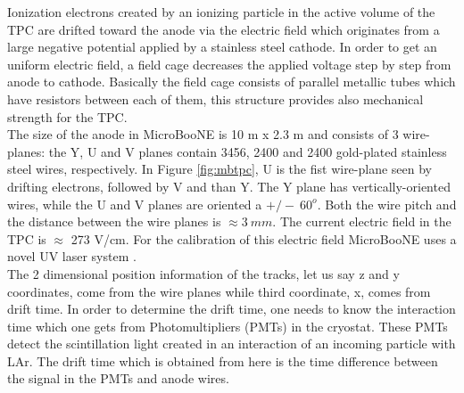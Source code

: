 \documentclass[a4paper]{article}\linespread{1.4}
\begin{document}
Ionization electrons created by an ionizing particle in the active volume of the TPC are drifted toward the anode via the electric field which originates from a large negative potential applied by a stainless steel cathode.
In order to get an uniform electric field, a field cage decreases the applied voltage step by step from anode to cathode. Basically the field cage consists of parallel metallic tubes which have resistors between each of them, this structure provides also mechanical strength for the TPC.
\\The size of the anode in MicroBooNE is 10 m x 2.3 m and consists of 3 wire-planes: the Y, U and V planes contain 3456, 2400 and 2400 gold-plated stainless steel wires, respectively. In Figure \ref{fig:mbtpc}, U is the fist wire-plane seen by drifting electrons, followed by V and than Y. The Y plane has vertically-oriented wires, while the U and V planes are oriented a $+/- \ 60^{o}$.
Both the wire pitch and the distance between the wire planes is $\approx 3~mm$.
The current electric field in the TPC is $\approx$ 273 V/cm. 
For the calibration of this electric field MicroBooNE uses a novel UV laser system \cite{prop}.
\\The 2 dimensional position information of the tracks, let us say z and y coordinates, come from the wire planes while third coordinate, x, comes from drift time. In order to determine the drift time, one needs to know the interaction time which one gets from Photomultipliers (PMTs) in the cryostat. These PMTs detect the scintillation light created in an interaction of an incoming particle with LAr. 
The drift time which is obtained from here is the time difference between the signal in the PMTs and anode wires.
\end{document}
